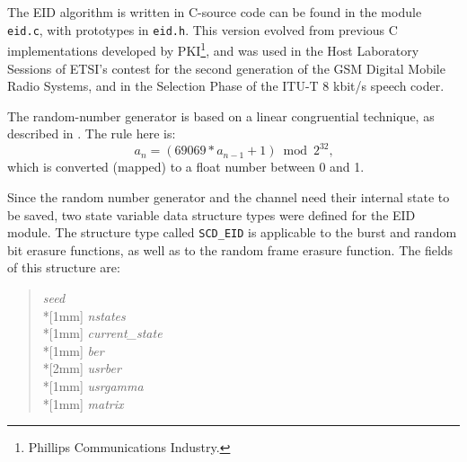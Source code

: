 The EID algorithm is written in C-source code can be found in the
module {\tt eid.c}, with prototypes in {\tt eid.h}. This version
evolved from previous C implementations developed by PKI\footnote{\SF
  Phillips Communications Industry.}, and was used in the Host
Laboratory Sessions of ETSI's contest for the second generation of the
GSM Digital Mobile Radio Systems, and in the Selection Phase of the
ITU-T 8 kbit/s speech coder.

The random-number generator is based on a linear congruential
technique, as described in \cite{Knuth}. The rule here is:
\[
   a_n = (69069 * a_{n-1} +1 ) \bmod 2^{32}\mbox{,}
\]
which is converted (mapped) to a float number between 0 and 1.

Since the random number generator and the channel need their internal
state to be saved, two state variable data structure types were defined
for the EID module. The structure type called {\tt SCD\_EID} is applicable
to the burst and random bit erasure functions, as well as to the random
frame erasure function. The fields of this structure are:
\begin{quote} \normalsize
 {\em seed}     \hfill {}\\*[1mm]
 {\em nstates}  \hfill {}\\*[1mm]
 {\em current\_state} \hfill {}\\*[1mm]
 {\em ber}      \hfill {}\\*[2mm]
 {\em usrber}   \hfill {}\\*[1mm]
 {\em usrgamma} \hfill {}\\*[1mm]
 {\em matrix}   \hfill {}\\
\end{quote}

